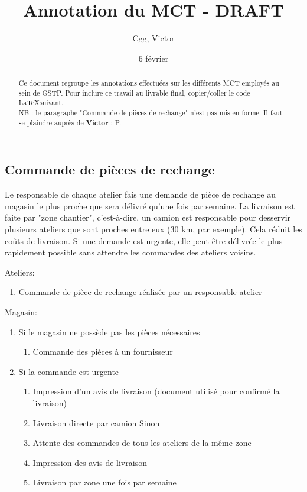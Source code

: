 \documentclass[a4paper]{article}
\title{Annotation du MCT - DRAFT}
\author{Cgg, Victor}
\date{6 février}
\begin{document}
\maketitle

\begin{abstract}
Ce document regroupe les annotations effectuées sur les différents MCT
employés au sein de GSTP. Pour inclure ce travail au livrable final,
copier/coller le code \LaTeX suivant.\\
NB : le paragraphe "Commande de pièces de rechange" n'est pas mis en forme.
Il faut se plaindre auprès de \textbf{Victor} :-P.
\end{abstract}

\subsection{Commande de pièces de rechange}

Le responsable de chaque atelier fais une demande de pièce de rechange au
magasin le plus proche que sera délivré qu'une fois par semaine.  La
livraison est faite par "zone chantier", c'est-à-dire, un camion est
responsable pour desservir plusieurs ateliers que sont proches entre eux
(30 km, par exemple). Cela réduit les coûts de livraison.
Si une demande est urgente, elle peut être délivrée le plus rapidement
possible sans attendre les commandes des ateliers voisins.

Ateliers:
\begin{enumerate}
    \item Commande de pièce de rechange réalisée par un responsable atelier
\end{enumerate}

Magasin:
\begin{enumerate}
    \item Si le magasin ne possède pas les pièces nécessaires
    \begin{enumerate}
        \item Commande des pièces à un fournisseur
    \end{enumerate}

    \item Si la commande est urgente
    \begin{enumerate}
        \item Impression d'un avis de livraison
        (document utilisé pour confirmé la livraison)
        \item Livraison directe par camion
        Sinon
        \item Attente des commandes de tous les ateliers de la même zone
        \item Impression des avis de livraison
        \item Livraison par zone une fois par semaine
    \end{enumerate}
\end{enumerate}
\end{document}
